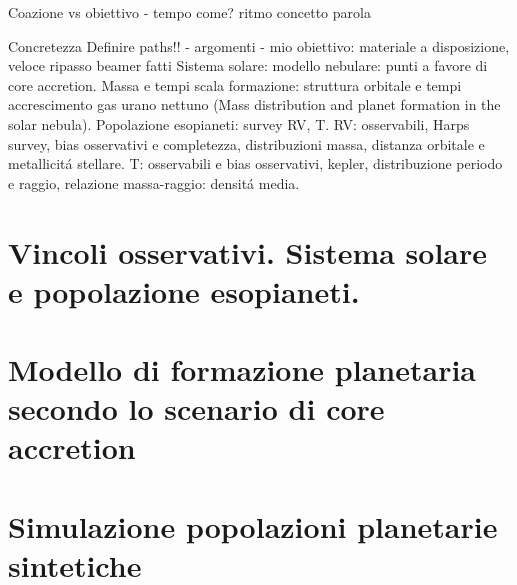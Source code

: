 \documentclass[10pt,xcolor={usenames},fleqn,serif]{beamer}
\begin{document}
\begin{wordonframe}{Coazione vs obiettivo - tempo come?}
ritmo concetto parola
\end{wordonframe}

\begin{wordonframe}{Concretezza}
Definire paths!! - argomenti - mio obiettivo: materiale a disposizione, veloce ripasso beamer fatti
Sistema solare: modello nebulare: punti a favore di core accretion. Massa e tempi scala formazione: struttura orbitale  e tempi accrescimento gas urano nettuno (Mass distribution and planet formation in the solar nebula).
Popolazione esopianeti: survey RV, T. RV: osservabili, Harps survey, bias osservativi e completezza, distribuzioni massa, distanza orbitale e metallicit\'a stellare. T: osservabili e bias osservativi, kepler, distribuzione periodo e raggio, relazione massa-raggio: densit\'a media.
\end{wordonframe}

\part{Vincoli osservativi. Sistema solare e popolazione esopianeti.}


\part{Modello di formazione planetaria secondo lo scenario di core accretion}


\part{Simulazione popolazioni planetarie sintetiche}

\end{document}
